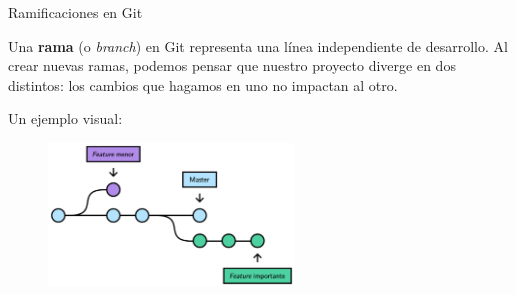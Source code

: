 \begin{frame}[t]{Ramificaciones en Git}


    Una \textbf{rama} (o \textit{branch}) en Git representa una línea independiente de desarrollo.
    Al crear nuevas ramas, podemos pensar que nuestro proyecto diverge en dos distintos:
    los cambios que hagamos en uno no impactan al otro.

    \pause
    \vspace{0.5em}
    Un ejemplo visual:

    \begin{figure}[ht]
        \begin{center}
            \includegraphics[height=1.5in]{images/branch.pdf}
        \end{center}
    \end{figure}




\end{frame}

